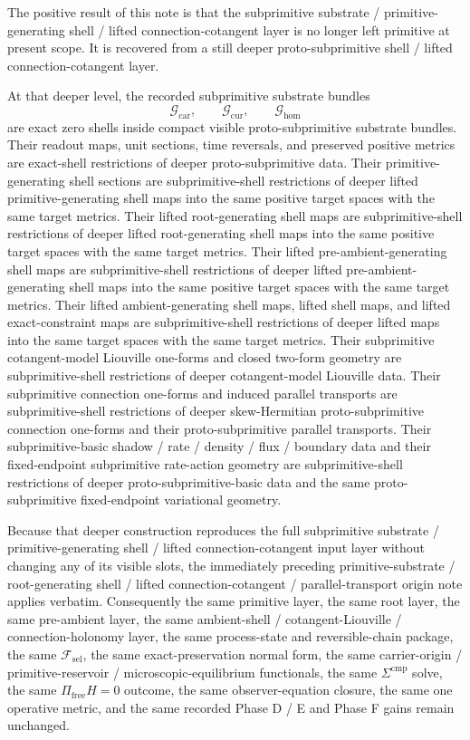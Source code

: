 \documentclass[11pt]{article}
\newcommand{\StemFunctional}{\mathscr F_{\mathrm{sel}}}
\newcommand{\Car}{\mathrm{car}}
\newcommand{\Cur}{\mathrm{cur}}
\newcommand{\Hom}{\mathrm{hom}}
\newcommand{\SubprimSpace}[1]{\mathcal G_{#1}}
\begin{document}
The positive result of this note is that the subprimitive substrate / primitive-generating shell / lifted connection-cotangent layer is no longer left primitive at present scope. It is recovered from a still deeper proto-subprimitive shell / lifted connection-cotangent layer.

At that deeper level, the recorded subprimitive substrate bundles
\[
\SubprimSpace{\Car},\qquad
\SubprimSpace{\Cur},\qquad
\SubprimSpace{\Hom}
\]
are exact zero shells inside compact visible proto-subprimitive substrate bundles. Their readout maps, unit sections, time reversals, and preserved positive metrics are exact-shell restrictions of deeper proto-subprimitive data. Their primitive-generating shell sections are subprimitive-shell restrictions of deeper lifted primitive-generating shell maps into the same positive target spaces with the same target metrics. Their lifted root-generating shell maps are subprimitive-shell restrictions of deeper lifted root-generating shell maps into the same positive target spaces with the same target metrics. Their lifted pre-ambient-generating shell maps are subprimitive-shell restrictions of deeper lifted pre-ambient-generating shell maps into the same positive target spaces with the same target metrics. Their lifted ambient-generating shell maps, lifted shell maps, and lifted exact-constraint maps are subprimitive-shell restrictions of deeper lifted maps into the same target spaces with the same target metrics. Their subprimitive cotangent-model Liouville one-forms and closed two-form geometry are subprimitive-shell restrictions of deeper cotangent-model Liouville data. Their subprimitive connection one-forms and induced parallel transports are subprimitive-shell restrictions of deeper skew-Hermitian proto-subprimitive connection one-forms and their proto-subprimitive parallel transports. Their subprimitive-basic shadow / rate / density / flux / boundary data and their fixed-endpoint subprimitive rate-action geometry are subprimitive-shell restrictions of deeper proto-subprimitive-basic data and the same proto-subprimitive fixed-endpoint variational geometry.

Because that deeper construction reproduces the full subprimitive substrate / primitive-generating shell / lifted connection-cotangent input layer without changing any of its visible slots, the immediately preceding primitive-substrate / root-generating shell / lifted connection-cotangent / parallel-transport origin note applies verbatim. Consequently the same primitive layer, the same root layer, the same pre-ambient layer, the same ambient-shell / cotangent-Liouville / connection-holonomy layer, the same process-state and reversible-chain package, the same \(\StemFunctional\), the same exact-preservation normal form, the same carrier-origin / primitive-reservoir / microscopic-equilibrium functionals, the same \(\Sigma^{\mathrm{cmp}}\) solve, the same \(\Pi_{\mathrm{free}}H=0\) outcome, the same observer-equation closure, the same one operative metric, and the same recorded Phase D / E and Phase F gains remain unchanged.
\end{document}
